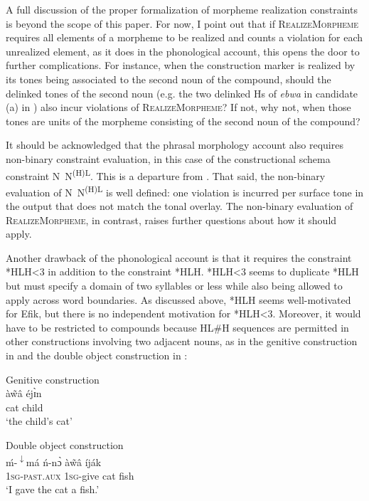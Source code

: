 \documentclass[output=paper]{langscibook}
\begin{document}
A full discussion of the proper formalization of morpheme realization constraints is beyond the scope of this paper. For now, I point out that if \textsc{RealizeMorpheme} requires all elements of a morpheme to be realized and counts a violation for each unrealized element, as it does in the phonological account, this opens the door to further complications. For instance, when the construction marker is realized by its tones being associated to the second noun of the compound, should the delinked tones of the second noun (e.g. the two delinked Hs of \textit{ebwa} in candidate (a) in ) also incur violations of \textsc{RealizeMorpheme}? If not, why not, when those tones are units of the morpheme consisting of the second noun of the compound? 

It should be acknowledged that the phrasal morphology account also requires non-binary constraint evaluation, in this case of the constructional schema constraint N~N\textsuperscript{(H)L}. This is a departure from \citet{McPherson2014}. That said, the non-binary evaluation of N~N\textsuperscript{(H)L} is well defined: one violation is incurred per surface tone in the output that does not match the tonal overlay. The non-binary evaluation of \textsc{RealizeMorpheme}, in contrast, raises further questions about how it should apply. 

Another drawback of the phonological account is that it requires the constraint *HLH<3 in addition to the constraint *HLH. *HLH<3 seems to duplicate *HLH but must specify a domain of two syllables or less while also being allowed to apply across word boundaries. As discussed above, *HLH seems well-motivated for Efik, but there is no independent motivation for *HLH<3. Moreover, it would have to be restricted to compounds because HL\#H sequences are permitted in other constructions involving two adjacent nouns, as in the genitive construction in  and the double object construction in : 


\ea \label{ex:glewwe:6}
Genitive construction\\
\gll \textup{à\~{w}â} éjɪ̀n\\
     cat child\\
\glt ‘the child’s cat’  
\z

\ea\label{ex:glewwe:7} 
Double object construction\\
\gll \textup{ḿ-}\textup{\textsuperscript{$\downarrow$}}\textup{má}     \textup{ń-nɔ̀} \textup{à\~{w}â   íják} \\
     \textsc{1sg-past.aux}  \textsc{1sg-}\textup{give}   \textup{cat}  {fish}\\
\glt ‘I gave the cat a fish.’ 
\z
\end{document}
